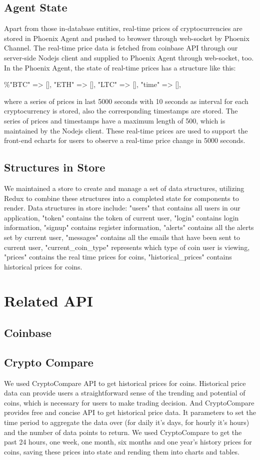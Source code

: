 \subsection{Agent State}
Apart from those in-database entities, real-time prices of 
cryptocurrencies are stored in Phoenix Agent and pushed to 
browser through web-socket by Phoenix Channel. The real-time 
price data is fetched from coinbase API through our server-side 
Nodejs client and supplied to Phoenix Agent through web-socket, 
too. In the Phoenix Agent, the state of real-time prices has 
a structure like this: 
\begin{center} 
\%{"BTC" => [], "ETH" => [], "LTC" => [], "time" => []}, 
\end{center}
where a series of prices in last 5000 seconds 
with 10 seconds as interval for each cryptocurrency is stored, 
also the corresponding timestamps are stored. The series of prices 
and timestamps have a maximum length of 500, which is maintained 
by the Nodejs client. These real-time prices are used to support 
the front-end echarts for users to observe a real-time price 
change in 5000 seconds. 
\subsection{Structures in Store}
We maintained a store to create and manage a set of data structures, 
utilizing Redux to combine these structures into a completed state 
for components to render. Data structures in store include: "users" 
that contains all users in our application, "token" contains the 
token of current user, "login" contains login information, "signup" 
contains register information, "alerts" contains all the alerts set 
by current user, "messages" contains all the emails that have been 
sent to current user, "current\_coin\_type" represents which type of 
coin user is viewing, "prices" contains the real time prices for 
coins, "historical\_prices" contains historical prices for coins.



\section{Related API}
\subsection{Coinbase}
\subsection{Crypto Compare}
We used CryptoCompare API to get historical prices for coins. 
Historical price data can provide users a straightforward sense 
of the trending and potential of coins, which is necessary for 
users to make trading decision. And CryptoCompare provides free 
and concise API to get historical price data. It parameters to 
set the time period to aggregate the data over (for daily it's 
days, for hourly it's hours) and the number of data points to 
return. We used CryptoCompare to get the past 24 hours, one week, 
one month, six months and one year's history prices for coins, 
saving these prices into state and rending them into charts and tables.

